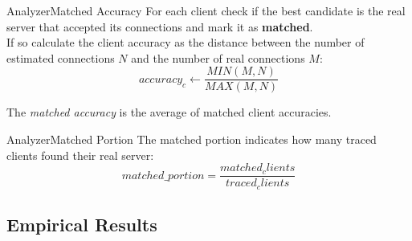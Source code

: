 	\begin{frame}{Analyzer}{Matched Accuracy}
		For each client check if the best candidate is the real server
that accepted its connections and mark it as \textbf{matched}.\\
		\vspace{20pt}
		If so calculate the client accuracy as the distance between the
number of estimated connections $N$ and the number of real connections
$M$:
	\begin{equation}
		 accuracy_c \gets \frac{ MIN(M, N)}{MAX(M, N)}
	\end{equation}
	
	The \emph{matched accuracy} is the average of matched client accuracies.
	
	\end{frame}

	\begin{frame}{Analyzer}{Matched Portion}
		The matched portion indicates how many traced clients 
 			found their real server:
		\begin{equation}
			matched\_portion = \frac{matched_clients}{traced_clients}
		\end{equation}
	\end{frame}
\subsection{Empirical Results}
